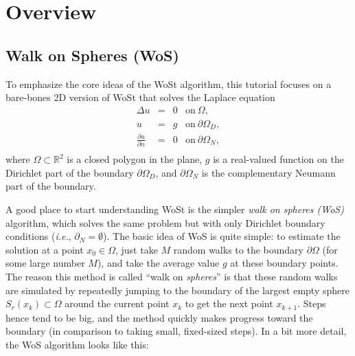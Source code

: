 \documentclass{article}
\newcommand{\ie}{\emph{i.e.}} %
\renewcommand{\vec}[1]{#1}
\begin{document}
\section{Overview}
\label{sec:Overview}

\subsection{Walk on Spheres (WoS)}
\label{sec:WalkOnSpheresOverview}

To emphasize the core ideas of the WoSt algorithm, this tutorial focuses on a bare-bones 2D version of WoSt that solves the Laplace equation
\[
   \begin{array}{rcll}
      \Delta u &=& 0 & \text{on}\ \Omega, \\
             u &=& g & \text{on}\ \partial\Omega_D, \\
             \tfrac{\partial u}{\partial n} &=& 0 & \text{on}\ \partial\Omega_N, \\
   \end{array}
\]
where \(\Omega \subset \mathbb{R}^2\) is a closed polygon in the plane, \(g\) is a real-valued function on the Dirichlet part of the boundary \(\partial\Omega_D\), and \(\partial\Omega_N\) is the complementary Neumann part of the boundary.  

A good place to start understanding WoSt is the simpler \emph{walk on spheres (WoS)} algorithm, which solves the same problem but with only Dirichlet boundary conditions (\ie, \(\partial_N = \emptyset\)).  The basic idea of WoS is quite simple: to estimate the solution at a point \(\vec{x}_0 \in \Omega\), just take \(M\) random walks to the boundary \(\partial\Omega\) (for some large number \(M\)), and take the average value \(g\) at these boundary points.  The reason this method is called ``walk on \emph{spheres}'' is that these random walks are simulated by repeatedly jumping to the boundary of the largest empty sphere \(S_r(\vec{x}_k) \subset \Omega\) around the current point \(\vec{x}_k\) to get the next point \(\vec{x}_{k+1}\).  Steps hence tend to be big, and the method quickly makes progress toward the boundary (in comparison to taking small, fixed-sized steps).  In a bit more detail, the WoS algorithm looks like this:
\end{document}
